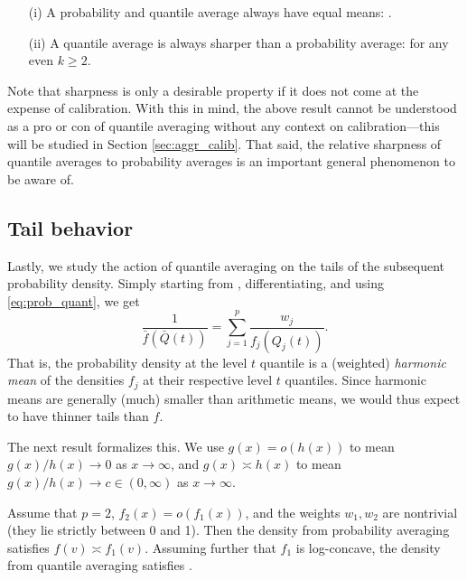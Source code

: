\documentclass{article}
\begin{document}
\begin{proposition}
\label{prop:moments_sharpness} \hfill
\begin{itemize}
\item[(i)] A probability and quantile average always have equal means:
  .  
\item[(ii)] A quantile average is always sharper than a probability average:
   for any even $k \geq 2$.   
\end{itemize}
\end{proposition}

Note that sharpness is only a desirable property if it does not come at the
expense of calibration. With this in mind, the above result cannot be understood
as a pro or con of quantile averaging without any context on calibration---this
will be studied in Section \ref{sec:aggr_calib}. That said, the relative
sharpness of quantile averages to probability averages is an important general
phenomenon to be aware of.  

\subsection{Tail behavior}

Lastly, we study the action of quantile averaging on the tails of the subsequent
probability density. Simply starting from , differentiating, and using \eqref{eq:prob_quant}, we get
\[
\frac{1}{\bar{f}(\bar{Q}(t))} = \sum_{j=1}^p \frac{w_j}{f_j(Q_j(t))}. 
\]
That is, the probability density  at the level $t$ quantile is
a (weighted) \emph{harmonic mean} of the densities $f_j$ at their respective
level $t$ quantiles. Since harmonic means are generally (much) smaller than
arithmetic means, we would thus expect  to have thinner tails
than $f$. 

The next result formalizes this. We use $g(x) = o(h(x))$ to mean $g(x)/h(x) \to
0$ as $x \to \infty$, and $g(x) \asymp h(x)$ to mean $g(x)/h(x) \to c \in (0,
\infty)$ as $x \to \infty$. 

\begin{proposition}
\label{prop:tail_behavior}
Assume that $p=2$, $f_2(x) = o(f_1(x))$, and the weights $w_1,w_2$ are
nontrivial (they lie strictly between 0 and 1). Then the density from
probability averaging satisfies $f(v) \asymp f_1(v)$. Assuming further that
$f_1$ is log-concave, the density from quantile averaging satisfies
.  
\end{proposition}
\end{document}
